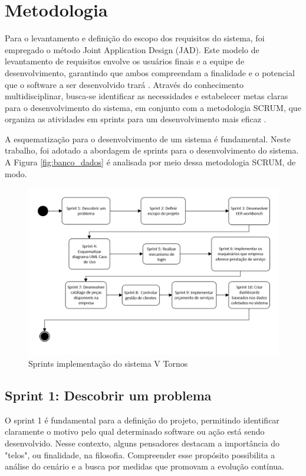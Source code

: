 \chapter{Metodologia}
\label{cha:metodologia}

Para o levantamento e definição do escopo dos requisitos do sistema, foi empregado o método Joint Application Design (JAD). Este modelo de levantamento de requisitos envolve os usuários finais e a equipe de desenvolvimento, garantindo que ambos compreendam a finalidade e o potencial que o software a ser desenvolvido trará \mbox{\cite{b:escolpo_projeto_2015}.} Através do conhecimento multidisciplinar, busca-se identificar as necessidades e estabelecer metas claras para o desenvolvimento do sistema, em conjunto com a metodologia SCRUM, que organiza as atividades em sprints para um desenvolvimento mais eficaz \mbox{\cite{b:scrum2015}.}

A esquematização para o desenvolvimento de um sistema é fundamental. Neste trabalho, foi adotado a abordagem de sprints para o desenvolvimento do sistema. A Figura \ref{fig:banco_dados} é analisada por meio dessa metodologia SCRUM, de modo.

\begin{figure}[htb!]
    \centering
    \includegraphics[width=0.75\linewidth]{figs/sprint_novo_modelo.png}
    \caption{Sprints implementação do sistema V Tornos}
    \label{fig:sprints}
\end{figure}

\section{Sprint 1: Descobrir um problema}
\label{sec:descobrir_problema}

O sprint 1 é fundamental para a definição do projeto, permitindo identificar claramente o motivo pelo qual determinado software ou ação está sendo desenvolvido. Nesse contexto, alguns pensadores destacam a importância do "telos", ou finalidade, na filosofia. Compreender esse propósito possibilita a análise do cenário e a busca por medidas que promovam a evolução contínua.

